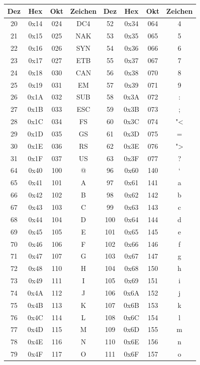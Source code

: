 \documentclass[%
11pt,%
twoside,%
titlepage,%
german,%
headsepline%
]{scrartcl}
\begin{document}
\begin{longtable}{|c|c|c|c||c|c|c|c|}
\hline
Dez & Hex & Okt & Zeichen & Dez & Hex & Okt & Zeichen\\
\hline
20 & 0x14 & 024 & DC4 & 52 & 0x34 & 064 & 4 \\
21 & 0x15 & 025 & NAK & 53 & 0x35 & 065 & 5 \\
22 & 0x16 & 026 & SYN & 54 & 0x36 & 066 & 6 \\
23 & 0x17 & 027 & ETB & 55 & 0x37 & 067 & 7 \\
24 & 0x18 & 030 & CAN & 56 & 0x38 & 070 & 8 \\
25 & 0x19 & 031 & EM & 57 & 0x39 & 071 & 9 \\
26 & 0x1A & 032 & SUB & 58 & 0x3A & 072 & : \\
27 & 0x1B & 033 & ESC & 59 & 0x3B & 073 & ; \\
28 & 0x1C & 034 & FS & 60 & 0x3C & 074 & "< \\
29 & 0x1D & 035 & GS & 61 & 0x3D & 075 & =\\
30 & 0x1E & 036 & RS & 62 & 0x3E & 076 & "> \\
31 & 0x1F & 037 & US & 63 & 0x3F & 077 & ? \\
64 & 0x40 & 100 & @ & 96 & 0x60 & 140 & ` \\
65 & 0x41 & 101 & A & 97 & 0x61 & 141 & a \\
66 & 0x42 & 102 & B & 98 & 0x62 & 142 & b \\
67 & 0x43 & 103 & C & 99 & 0x63 & 143 & c \\
68 & 0x44 & 104 & D & 100 & 0x64 & 144 & d \\
69 & 0x45 & 105 & E & 101 & 0x65 & 145 & e \\
70 & 0x46 & 106 & F & 102 & 0x66 & 146 & f \\
71 & 0x47 & 107 & G & 103 & 0x67 & 147 & g \\
72 & 0x48 & 110 & H & 104 & 0x68 & 150 & h \\
73 & 0x49 & 111 & I & 105 & 0x69 & 151 & i \\
74 & 0x4A & 112 & J & 106 & 0x6A & 152 & j \\
75 & 0x4B & 113 & K & 107 & 0x6B & 153 & k \\
76 & 0x4C & 114 & L & 108 & 0x6C & 154 & l \\
77 & 0x4D & 115 & M & 109 & 0x6D & 155 & m \\
78 & 0x4E & 116 & N & 110 & 0x6E & 156 & n \\
79 & 0x4F & 117 & O & 111 & 0x6F & 157 & o \\

\end{longtable}
\end{document}

